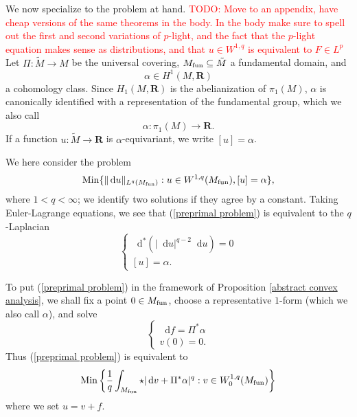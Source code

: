 \documentclass[reqno,11pt]{amsart}
\newcommand{\RR}{\mathbf{R}}
\newcommand*\dif{\mathop{}\!\mathrm{d}}
\newcommand{\Min}{\mathrm{Min}}
\theoremstyle{definition}
\numberwithin{equation}{section}
\newcommand\todo[1]{\textcolor{red}{TODO: #1}}
\begin{document}
We now specialize to the problem at hand. \todo{Move to an appendix, have cheap versions of the same theorems in the body. In the body make sure to spell out the first and second variations of $p$-light, and the fact that the $p$-light equation makes sense as distributions, and that $u \in W^{1, q}$ is equivalent to $F \in L^p$}
Let $\Pi: \tilde M \to M$ be the universal covering, $M_{\rm fun} \subseteq \tilde M$ a fundamental domain, and
$$\alpha \in H^1(M, \RR)$$
a cohomology class.
Since $H_1(M, \RR)$ is the abelianization of $\pi_1(M)$, $\alpha$ is canonically identified with a representation of the fundamental group, which we also call
$$\alpha: \pi_1(M) \to \RR.$$
If a function $u: \tilde M \to \RR$ is $\alpha$-equivariant, we write $[u] = \alpha$.

We here consider the problem
\begin{equation}\label{preprimal problem}
	\Min\{\|\dif u\|_{L^q(M_{\rm fun})}: u \in W^{1, q}(M_{\rm fun}), [u] = \alpha\},
\end{equation}
where $1 < q < \infty$; we identify two solutions if they agree by a constant.
Taking Euler-Lagrange equations, we see that (\ref{preprimal problem}) is equivalent to the $q$-Laplacian 
\begin{equation}\label{qLaplace}
\begin{cases}
	\dif^*(|\dif u|^{q - 2} \dif u) = 0 \\
	[u] = \alpha.
\end{cases}
\end{equation}

To put (\ref{preprimal problem}) in the framework of Proposition \ref{abstract convex analysis}, we shall fix a point $0 \in M_{\rm fun}$, choose a representative $1$-form (which we also call $\alpha$), and solve 
$$\begin{cases}
\dif f = \Pi^* \alpha \\
v(0) = 0.
\end{cases}$$
Thus (\ref{preprimal problem}) is equivalent to
\begin{equation}\label{primal problem}
	\Min\left\{\frac{1}{q} \int_{M_{\rm fun}} \star|\dif v + \Pi^* \alpha|^q: v \in W^{1, q}_0(M_{\rm fun})\right\}
\end{equation}
where we set $u = v + f$.
\end{document}
